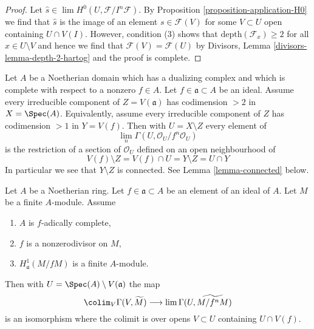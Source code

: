 \begin{proof}
Let $\hat s \in \lim H^0(U, \mathcal{F}/I^n\mathcal{F})$.
By Proposition \ref{proposition-application-H0}
we find that $\hat s$ is the image of an element $s \in \mathcal{F}(V)$
for some $V \subset U$ open containing $U \cap V(I)$.
However, condition (3) shows that $\text{depth}(\mathcal{F}_x) \geq 2$
for all $x \in U \setminus V$ and hence we find that
$\mathcal{F}(V) = \mathcal{F}(U)$ by
Divisors, Lemma \ref{divisors-lemma-depth-2-hartog}
and the proof is complete.
\end{proof}

\begin{example}
\label{example-H0}
Let $A$ be a Noetherian domain which has a dualizing complex
and which is complete with respect to a nonzero $f \in A$.
Let $f \in \mathfrak a \subset A$ be an ideal.
Assume every irreducible component of $Z = V(\mathfrak a)$
has codimension $> 2$ in $X = \Spec(A)$. Equivalently, assume every
irreducible component of $Z$ has codimension $> 1$ in $Y = V(f)$.
Then with
$U = X \setminus Z$ every element of
$$
\lim_n \Gamma(U, \mathcal{O}_U/f^n \mathcal{O}_U)
$$
is the restriction of a section of $\mathcal{O}_U$ defined on an
open neighbourhood of
$$
V(f) \setminus Z = V(f) \cap U = Y \setminus Z = U \cap Y
$$
In particular we see that $Y \setminus Z$ is connected. See
Lemma \ref{lemma-connected} below.
\end{example}

\begin{lemma}
\label{lemma-alternative-colim-H0}
Let $A$ be a Noetherian ring. Let $f \in \mathfrak a \subset A$
be an element of an ideal of $A$. Let $M$ be a finite $A$-module.
Assume
\begin{enumerate}
\item $A$ is $f$-adically complete,
\item $f$ is a nonzerodivisor on $M$,
\item $H^1_\mathfrak a(M/fM)$ is a finite $A$-module.
\end{enumerate}
Then with $U = \Spec(A) \setminus V(\mathfrak a)$ the map
$$
\colim_V \Gamma(V, \widetilde{M})
\longrightarrow
\lim \Gamma(U, \widetilde{M/f^nM})
$$
is an isomorphism where the colimit is over opens $V \subset U$
containing $U \cap V(f)$.
\end{lemma}

